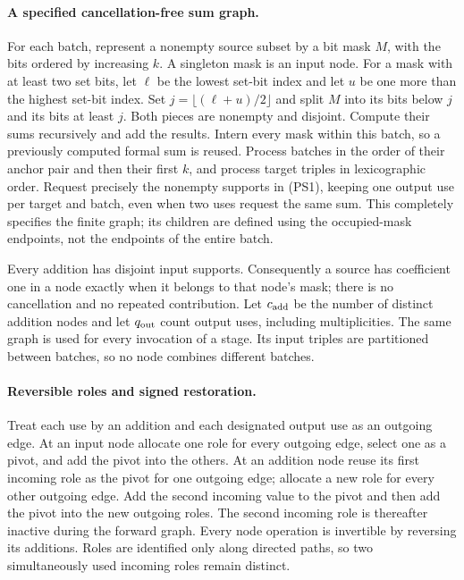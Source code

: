\paragraph{A specified cancellation-free sum graph.}
For each batch, represent a nonempty source subset by a bit mask $M$, with
the bits ordered by increasing $k$.  A singleton mask is an input node.
For a mask with at least two set bits, let $\ell$ be the lowest set-bit
index and let $u$ be one more than the highest set-bit index.  Set
$j=\lfloor(\ell+u)/2\rfloor$ and split $M$ into its bits below $j$ and
its bits at least $j$.  Both pieces are nonempty and disjoint.  Compute
their sums recursively and add the results.  Intern every mask within
this batch, so a previously computed formal sum is reused.  Process
batches in the order of their anchor pair and then their first $k$, and
process target triples in lexicographic order.  Request precisely the
nonempty supports in (PS1), keeping one output use per target and batch,
even when two uses request the same sum.  This completely specifies the
finite graph; its children are defined using the occupied-mask endpoints,
not the endpoints of the entire batch.

Every addition has disjoint input supports.  Consequently a source has
coefficient one in a node exactly when it belongs to that node's mask;
there is no cancellation and no repeated contribution.  Let $c_{\rm add}$
be the number of distinct addition nodes and let $q_{\rm out}$ count
output uses, including multiplicities.  The same graph is used for every
invocation of a stage.  Its input triples are partitioned between batches,
so no node combines different batches.

\paragraph{Reversible roles and signed restoration.}
Treat each use by an addition and each designated output use as an outgoing
edge.  At an input node allocate one role for every outgoing edge, select
one as a pivot, and add the pivot into the others.  At an addition node
reuse its first incoming role as the pivot for one outgoing edge; allocate
a new role for every other outgoing edge.  Add the second incoming value
to the pivot and then add the pivot into the new outgoing roles.  The
second incoming role is thereafter inactive during the forward graph.
Every node operation is invertible by reversing its additions.  Roles
are identified only along directed paths, so two simultaneously used
incoming roles remain distinct.

